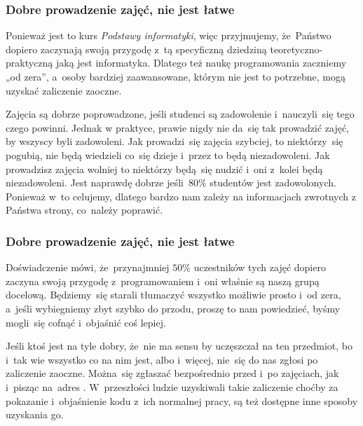 \documentclass[10pt,t]{beamer}
\begin{document}
\begin{frame}
  \frametitle{Dobre prowadzenie zajęć, nie jest łatwe}


  Ponieważ jest to kurs \textit{Podstawy informatyki}, więc przyjmujemy,
  że~Państwo dopiero zaczynają swoją przygodę z~tą specyficzną dziedziną
  teoretyczno-praktyczną jaką jest informatyka. Dlatego też naukę
  programowania zaczniemy „od zera”, a~osoby bardziej zaawansowane, którym
  nie jest to potrzebne, mogą uzyskać zaliczenie zaoczne.

  Zajęcia są dobrze poprowadzone, jeśli studenci są zadowolenie
  i~nauczyli~się tego czego powinni. Jednak w praktyce, prawie nigdy nie
  da~się tak prowadzić zajęć, by wszyscy byli zadowoleni. Jak prowadzi~się
  zajęcia szybciej, to niektórzy~się pogubią, nie będą wiedzieli co~się
  dzieje i~przez to będą niezadowoleni. Jak prowadzisz zajęcia wolniej to
  niektórzy będą~się nudzić i~oni z~kolei będą niezadowoleni. Jest naprawdę
  dobrze jeśli~$80\%$ studentów jest zadowolonych. Ponieważ w~to celujemy,
  dlatego bardzo nam zależy na informacjach zwrotnych z Państwa strony,
  co~należy poprawić.

\end{frame}





\begin{frame}
  \frametitle{Dobre prowadzenie zajęć, nie jest łatwe}


  Doświadczenie mówi, że~przynajmniej $50\%$ uczestników tych zajęć dopiero
  zaczyna swoją przygodę z~programowaniem i~oni właśnie są naszą grupą
  docelową. Będziemy~się starali tłumaczyć wszystko możliwie prosto i~od
  zera, a~jeśli wybiegniemy zbyt szybko do przodu, proszę to nam powiedzieć,
  byśmy mogli~się cofnąć i~objaśnić coś lepiej.

  Jeśli ktoś jest na tyle dobry, że~nie ma sensu by uczęszczał na ten
  przedmiot, bo i~tak wie wszystko co na nim jest, albo i~więcej, nie~się
  do nas zgłosi po zaliczenie zaoczne. Można~się zgłaszać bezpośrednio
  przed i~po zajęciach, jak i~pisząc na~adres \email. W~przeszłości ludzie
  uzyskiwali takie zaliczenie choćby za pokazanie i~objaśnienie kodu z~ich
  normalnej pracy, są też dostępne inne sposoby uzyskania go.

\end{frame}
\end{document}
